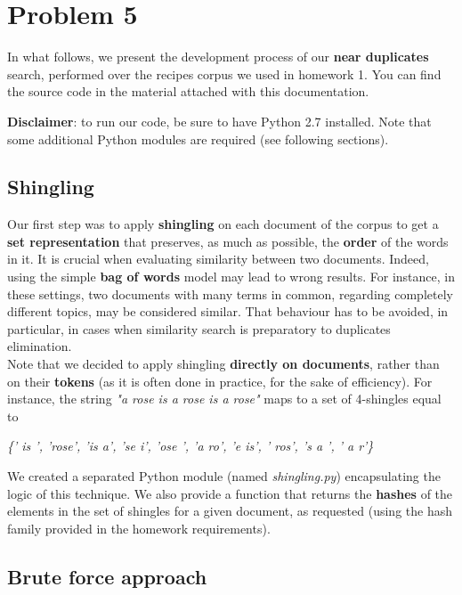 
\section{Problem 5}

In what follows, we present the development process of our \textbf{near duplicates} search, performed over the recipes corpus we used in homework 1. You can find the source code in the material attached with this documentation.\medskip

\noindent\textbf{Disclaimer}: to run our code, be sure to have Python 2.7 installed. Note that some additional Python modules are required (see following sections).

\subsection{Shingling}

Our first step was to apply \textbf{shingling}\cite{shin} on each document of the corpus to get a \textbf{set representation} that preserves, as much as possible, the \textbf{order} of the words in it. It is crucial when evaluating similarity between two documents.
Indeed, using the simple \textbf{bag of words} model may lead to wrong results. For instance, in these settings, two documents with many terms in common, regarding completely different topics, may be considered similar.
That behaviour has to be avoided, in particular, in cases when similarity search is preparatory to duplicates elimination.\\
Note that we decided to apply shingling \textbf{directly on documents}, rather than on their \textbf{tokens} (as it is often done in practice, for the sake of efficiency). For instance, the string \textit{"a rose is a rose is a rose"} maps to a set of 4-shingles equal to
\begin{center}
\textit{\{' is ', 'rose', 'is a', 'se i', 'ose ', 'a ro', 'e is', ' ros', 's a ', ' a r'\}}
\end{center}
\medskip

\noindent We created a separated Python module (named \textit{shingling.py}) encapsulating the logic of this technique. We also provide a function that returns the \textbf{hashes} of the elements in the set of shingles for a given document, as requested (using the hash family provided in the homework requirements).

\subsection{Brute force approach}

